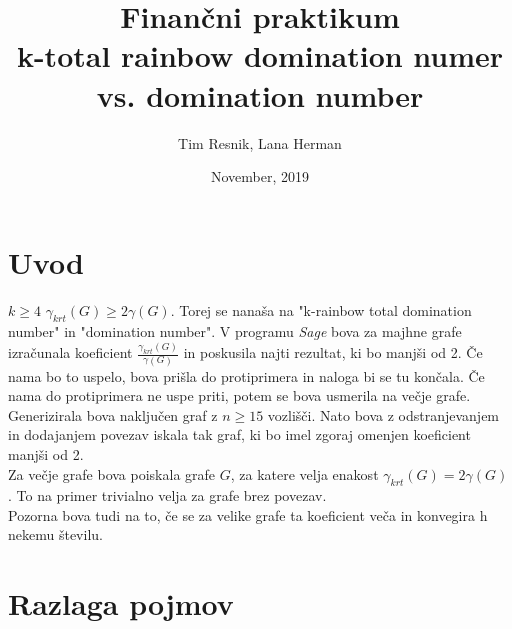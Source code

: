 \documentclass[a4paper]{article}
\title{\normalsize Finančni praktikum\\[1.5mm]
\large \textbf{k-total rainbow domination numer vs. domination number}}
\author{Tim Resnik, Lana Herman \\[1.5mm]}
\date{November, 2019}
\begin{document}
\maketitle

\section{Uvod}

 $k \geq 4$  $\gamma_{krt}(G) \geq 2\gamma(G)$. Torej se nanaša na "k-rainbow total domination number" in "domination number". V programu \textit{Sage} bova za majhne grafe izračunala koeficient $\frac{\gamma_{krt}(G)}{\gamma(G)}$ in poskusila najti rezultat, ki bo manjši od 2. Če nama bo to uspelo, bova prišla do protiprimera in naloga bi se tu končala. Če nama do protiprimera ne uspe priti, potem se bova usmerila na večje grafe. Generizirala bova naključen graf z $n \geq 15$ vozlišči. Nato bova z odstranjevanjem in dodajanjem povezav iskala tak graf, ki bo imel zgoraj omenjen koeficient manjši od 2.\\
Za večje grafe bova poiskala grafe $G$, za katere velja enakost $\gamma_{krt}(G) = 2\gamma(G)$. To na primer trivialno velja za grafe brez povezav.\\
Pozorna bova tudi na to, če se za velike grafe ta koeficient veča in konvegira h nekemu številu.

\section{Razlaga pojmov}
\end{document}

